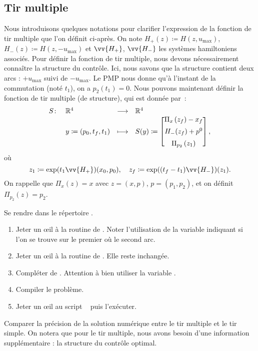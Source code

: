 \subsection{Tir multiple}

Nous introduisons quelques notations pour clarifier l'expression de la fonction de tir multiple que l'on d\'efinit ci-apr\`es.
On note $H_+(z) \coloneqq H(z, u_\mathrm{max})$, $H_-(z) \coloneqq H(z, -u_\mathrm{max})$ et $\vv{H_+}$, $\vv{H_-}$ les syst\`emes hamiltoniens associ\'es.
Pour d\'efinir la fonction de tir multiple, nous devons n\'ecessairement conna\^itre la structure du contr\^ole. Ici, nous savons que la structure 
contient deux arcs : $+u_\mathrm{max}$ suivi de $-u_\mathrm{max}$. Le PMP nous donne qu'\`a l'instant de la commutation (not\'e $t_1$), on a $p_2(t_1) = 0$.
Nous pouvons maintenant d\'efinir la fonction de tir multiple (de structure), qui est donn\'ee par~:
\begin{equation*}
    \begin{array}{rlll}
        S \colon    & \mathbb{R}^4          & \longrightarrow   & \mathbb{R}^4 \\
        & y\coloneqq(p_0, t_f, t_1) & \longmapsto       & S(y) \coloneqq
        \begin{bmatrix}
            \Pi_x\left( z_f \right) - x_f \\[0.5em]
            H_-(z_f)+p^0                  \\[0.5em]
            \Pi_{p_2}\left( z_1 \right)
        \end{bmatrix},
    \end{array}
\end{equation*}
o\`u
\[
    z_1 \coloneqq \expmap{x_0,p_0}{t_1}{\vv{H_+}}, \quad z_f \coloneqq \expmap{z_1}{(t_f-t_1)}{\vv{H_-}}.
\]
On rappelle que $\Pi_x(z) = x$ avec $z=(x,p)$, $p=(p_1, p_2)$, et on d\'efinit $\Pi_{p_2}(z) = p_2$.

\begin{myExercice} Se rendre dans le r\'epertoire 
    .
    \begin{enumerate}
        \item Jeter un \oe il \`a la routine  de . Noter l'utilisation de la variable  indiquant si l'on se trouve
            sur le premier o\`u le second arc.
        \item Jeter un \oe il \`a la routine  de . Elle reste inchang\'ee.
        \item Compl\'eter  de . Attention \`a bien utiliser la variable .
        \item Compiler le probl\`eme.
        \item Jeter un \oe il au script \matlab\  puis l'ex\'ecuter.
    \end{enumerate}
\end{myExercice}

\begin{myremark}
    \anoter
    Comparer la pr\'ecision de la solution num\'erique entre le tir multiple et le tir simple. On notera que pour le tir multiple, nous avons
    besoin d'une information suppl\'ementaire : la structure du contr\^ole optimal.
\end{myremark}
